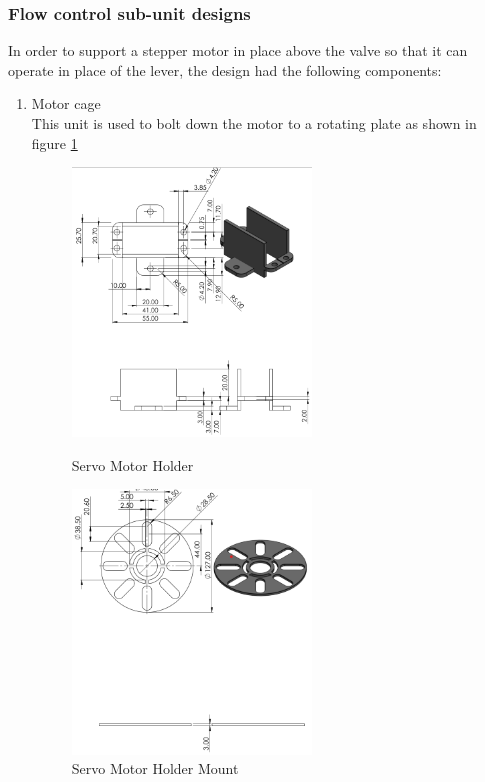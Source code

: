 \subsubsection{Flow control sub-unit designs}
In order to support a stepper motor in place above the valve so that it can operate in place of the lever, the design had the following components:
\begin{enumerate}
    \item Motor cage\\
    This  unit is used to bolt down the motor to a rotating plate as shown in figure \ref{fig:holder1}
    \begin{figure}[p]
    \centering
    \includegraphics[width=0.6\textwidth]{Figures/servoMotorHolder.png}
    \caption{Servo Motor Holder}
    \includegraphics[width=0.6\textwidth]{Figures/servoMotorRotaryMount.png}
    \caption{Servo Motor Holder Mount }
    \label{fig:holder1}

\end{figure}
\end{enumerate}
